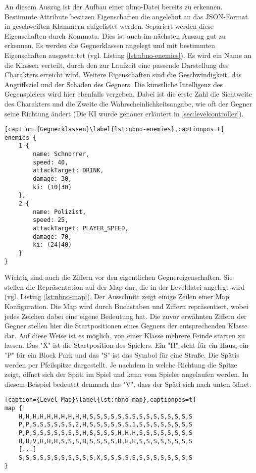 An diesem Auszug ist der Aufbau einer nbno-Datei bereits zu erkennen. Bestimmte Attribute besitzen Eigenschaften die angelehnt an das JSON-Format in geschweiften Klammern aufgelistet werden. Separiert werden diese Eigenschaften durch Kommata.\newline
Dies ist auch im nächsten Auszug gut zu erkennen. Es werden die Gegnerklassen angelegt und mit bestimmten Eigenschaften ausgestattet (vgl. Listing \ref{lst:nbno-enemies}). Es wird ein Name an die Klassen verteilt, durch den zur Laufzeit eine passende Darstellung des Charakters erreicht wird. Weitere Eigenschaften sind die Geschwindigkeit, das Angriffsziel und der Schaden des Gegners. Die künstliche Intelligenz des Gegenspielers wird hier ebenfalls vergeben. Dabei ist die erste Zahl die Sichtweite des Charakters und die Zweite die Wahrscheinlichkeitsangabe, wie oft der Gegner seine Richtung ändert (Die KI wurde genauer erläutert in \ref{sec:levelcontroller}).\newline
\begin{lstlisting}[caption={Gegnerklassen}\label{lst:nbno-enemies},captionpos=t]
enemies {
    1 {
        name: Schnorrer,
        speed: 40,
        attackTarget: DRINK,
        damage: 30,
        ki: (10|30)
    },
    2 {
        name: Polizist,
        speed: 25,
        attackTarget: PLAYER_SPEED,
        damage: 70,
        ki: (24|40)
    }
}
\end{lstlisting}

Wichtig sind auch die Ziffern vor den eigentlichen Gegnereigenschaften. Sie stellen die Repräsentation auf der Map dar, die in der Leveldatei angelegt wird (vgl. Listing \ref{lst:nbno-map}). Der Ausschnitt zeigt einige Zeilen einer Map Konfiguration. Die Map wird durch Buchstaben und Ziffern repräsentiert, wobei jedes Zeichen dabei eine eigene Bedeutung hat. Die zuvor erwähnten Ziffern der Gegner stellen hier die Startpositionen eines Gegners der entsprechenden Klasse dar. Auf diese Weise ist es möglich, von einer Klasse mehrere Feinde starten zu lassen.\newline
Das "X" ist die Startposition des Spielers. Ein "H" steht für ein Haus, ein "P" für ein Block Park und das "S" ist das Symbol für eine Straße. Die Spätis werden per Pfeilspitze dargestellt. Je nachdem in welche Richtung die Spitze zeigt, öffnet sich der Späti im Spiel und kann vom Spieler angelaufen werden. In diesem Beispiel bedeutet demnach das "V", dass der Späti sich nach unten öffnet. \newline
\begin{minipage}{\linewidth}
\begin{lstlisting}[caption={Level Map}\label{lst:nbno-map},captionpos=t] 
map {
    H,H,H,H,H,H,H,H,H,H,S,S,S,S,S,S,S,S,S,S,S,S,S,S,S
    P,P,S,S,S,S,S,S,2,H,S,S,S,S,S,S,1,S,S,S,S,S,S,S,S
    P,P,S,S,S,S,S,S,S,H,S,S,S,S,H,H,H,S,S,S,S,S,S,S,S
    H,H,V,H,H,H,S,S,S,H,S,S,S,S,H,H,H,S,S,S,S,S,S,S,S
	[...]
    S,S,S,S,S,S,S,S,S,S,S,X,S,S,S,S,S,S,S,S,S,S,S,S,S
}
\end{lstlisting}
\end{minipage}

